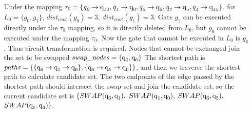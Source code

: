 \documentclass[runningheads]{llncs}
\begin{document}
\begin{example}
	Under the mapping $\tau_{0}=\{\textit{q}_\textit{0}\rightarrow  \textup{q}_{\textup{10}},\textit{q}_\textit{1}\rightarrow \textup{q}_{\textup{0}},
\textit{q}_\textit{2}\rightarrow  \textup{q}_{\textup{6}},\textit{q}_\textit{3}\rightarrow  \textup{q}_{\textup{5}},\textit{q}_\textit{4}\rightarrow  \textup{q}_{\textup{11}}\}$, 
for $L_{0}=\{g_{0},g_{1}\}$, $dist_{cnot}(g_{0})=3,\ dist_{cnot}(g_{1})=3$. 
Gate $g_{1}$ can be executed directly under the $\tau_{0}$ mapping, so it is directly deleted from $L_{0}$,
but $g_{0}$ cannot be executed under the mapping $\tau_{0}$. 
Now the gate that cannot be executed in $L_{0}$ is $g_{0}$. 
Thus circuit transformation is required. 
Nodes that cannot be exchanged join the set to be swapped $swap\_nodes=\{\textup{q}_{\textup{0}},\textup{q}_\textup{6}\}$
The shortest path is $paths=\{\{\textup{q}_{\textup{6}}\rightarrow \textup{q}_{\textup{1}} \rightarrow \textup{q}_{0} \},\{\textup{q}_\textup{6}\rightarrow \textup{q}_\textup{5} \rightarrow \textup{q}_\textup{0} \}\}$, 
and then we traverse the shortest path to calculate candidate set.
The two endpoints of the edge passed by the shortest path should intersect the swap set and join the candidate set.
so the current candidate set is $\{SWAP(\textup{q}_\textup{6},\textup{q}_\textup{1}),$ $SWAP(\textup{q}_\textup{1},\textup{q}_\textup{0}),$ $SWAP(\textup{q}_\textup{6},\textup{q}_\textup{5}),$ $SWAP(\textup{q}_\textup{5},\textup{q}_\textup{0}) \}$.
\end{example}
\end{document}
